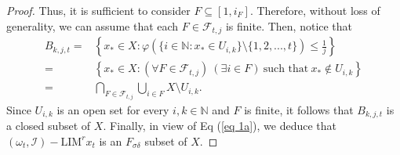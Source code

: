 \documentclass[reqno]{amsart}
\begin{document}
{\begin{proof}
	Thus, it is sufficient to consider \( F \subseteq [1,i_F] \). Therefore, without loss of generality, we can assume that each \( F \in \mathscr{F}_{t,j} \) is finite.
	Then, notice that 
	\begin{align*}
		B_{k,j,t}=&\left\{x_*\in X:  \varphi(\{i\in\mathbb{N}:x_*\in U_{i,k} \}\setminus\{1,2,...,t\})\leq\frac{1}{j}\right\}\\
		=&\left\{x_*\in X: (\forall F\in \mathscr{F}_{t,j})~(\exists i\in F)~\mbox{such that}~x_*\notin U_{i,k}\right\}\\
		=& \bigcap_{F\in \mathscr{F}_{t,j}} \bigcup_{i\in F} X\setminus U_{i,k}.
	\end{align*}
	Since $U_{i,k}$ is an open set for every $i,k\in\mathbb{N}$ and $F$ is finite, it follows that  $B_{k,j,t}$  is a closed subset of $X.$ Finally, in view of Eq (\ref{eq 1a}), we deduce that $(\omega_t,\mathcal{I})-\text{LIM}^r x_t$ is an $F_{\sigma\delta}$ subset of $X.$
	\end{proof}

}
\end{document}

